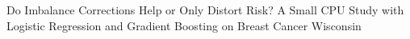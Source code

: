 Do Imbalance Corrections Help or Only Distort Risk? A Small CPU Study with Logistic Regression and Gradient Boosting on Breast Cancer Wisconsin
